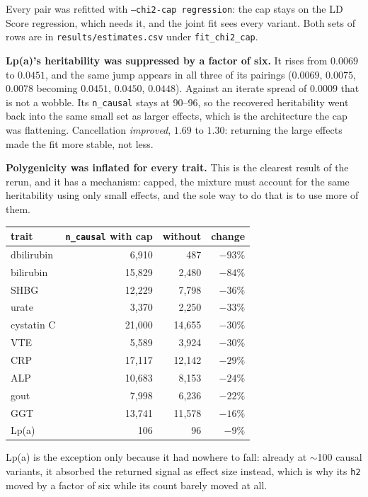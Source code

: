 Every pair was refitted with \texttt{--chi2-cap regression}: the cap stays on
the LD Score regression, which needs it, and the joint fit sees every variant.
Both sets of rows are in \texttt{results/estimates.csv} under
\texttt{fit\_chi2\_cap}.

\textbf{Lp(a)'s heritability was suppressed by a factor of six.} It rises from
$0.0069$ to $0.0451$, and the same jump appears in all three of its pairings
($0.0069$, $0.0075$, $0.0078$ becoming $0.0451$, $0.0450$, $0.0448$). Against an
iterate spread of $0.0009$ that is not a wobble. Its \texttt{n\_causal} stays at
90--96, so the recovered heritability went back into the same small set as
larger effects, which is the architecture the cap was flattening. Cancellation
\emph{improved}, $1.69$ to $1.30$: returning the large effects made the fit more
stable, not less.

\textbf{Polygenicity was inflated for every trait.} This is the clearest result
of the rerun, and it has a mechanism: capped, the mixture must account for the
same heritability using only small effects, and the sole way to do that is to
use more of them.

\begin{center}
\begin{tabular}{@{}lrrr@{}}
\toprule
trait & \texttt{n\_causal} with cap & without & change \\
\midrule
dbilirubin & 6{,}910 &   487 & $-93\%$ \\
bilirubin  & 15{,}829 & 2{,}480 & $-84\%$ \\
SHBG       & 12{,}229 & 7{,}798 & $-36\%$ \\
urate      & 3{,}370 & 2{,}250 & $-33\%$ \\
cystatin C & 21{,}000 & 14{,}655 & $-30\%$ \\
VTE        & 5{,}589 & 3{,}924 & $-30\%$ \\
CRP        & 17{,}117 & 12{,}142 & $-29\%$ \\
ALP        & 10{,}683 & 8{,}153 & $-24\%$ \\
gout       & 7{,}998 & 6{,}236 & $-22\%$ \\
GGT        & 13{,}741 & 11{,}578 & $-16\%$ \\
Lp(a)      &   106 &    96 & $-9\%$ \\
\bottomrule
\end{tabular}
\end{center}

Lp(a) is the exception only because it had nowhere to fall: already at
$\sim$100 causal variants, it absorbed the returned signal as effect size
instead, which is why its \texttt{h2} moved by a factor of six while its count
barely moved at all.

